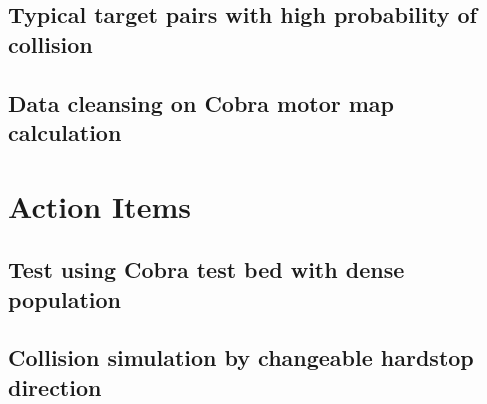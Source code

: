 \documentclass[a4paper,notitlepage]{article}
\begin{document}
\subsection{Typical target pairs with high probability of collision}


\subsection{Data cleansing on Cobra motor map calculation}



\section{Action Items}

\subsection{Test using Cobra test bed with dense population}

\subsection{Collision simulation by changeable hardstop direction}
\end{document}
